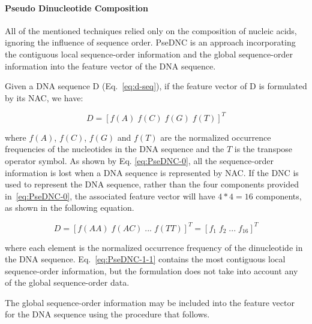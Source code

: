 \paragraph{Pseudo Dinucleotide Composition}


All of the mentioned techniques relied only on the composition of nucleic acids, ignoring the influence of sequence order. \gls{PseDNC} is an approach incorporating the contiguous local sequence-order information and the global sequence-order information into the feature vector of the \gls{DNA} sequence. 

Given a \gls{DNA} sequence D (Eq.~\ref{eq:d-seq}), if the feature vector of D is formulated by its \gls{NAC}, we have:


\begin{equation}\label{eq:PseDNC-0}
    D = [f(A)\;f(C)\;f(G)\;f(T)]^{T}
\end{equation}

\noindent where $f(A)$, $f(C)$, $f(G)$ and $f(T)$ are the normalized occurrence frequencies of the nucleotides in the \gls{DNA} sequence and the $T$ is the transpose operator symbol. As shown by Eq. \ref{eq:PseDNC-0}, all the sequence-order information is lost when a \gls{DNA} sequence is represented by \gls{NAC}. If the \gls{DNC} is used to represent the \gls{DNA} sequence, rather than the four components provided in~\ref{eq:PseDNC-0}, the associated feature vector will have $4 * 4 = 16$ components, as shown in the following equation.

\begin{equation}\label{eq:PseDNC-1-1}
    D = [f(AA)\;f(AC)\;...\;f(TT)]^{T} = [f_{1}\;f_{2} \;...\;f_{16}]^{T}
\end{equation}

\noindent where each element is the normalized occurrence frequency of the dinucleotide in the \gls{DNA} sequence. Eq.~\ref{eq:PseDNC-1-1} contains the most contiguous local sequence-order information, but the formulation does not take into account any of the global sequence-order data.

The global sequence-order information may be included into the feature vector for the \gls{DNA} sequence using the procedure that follows.

